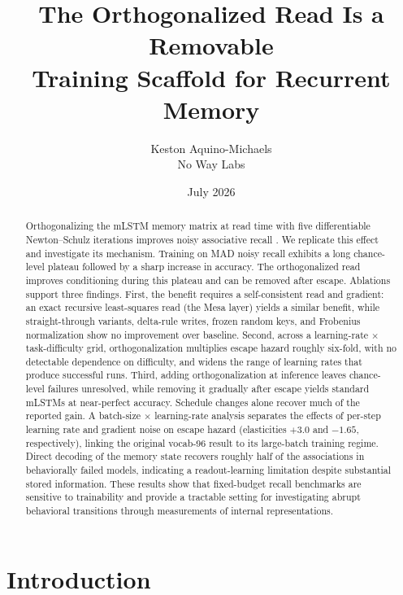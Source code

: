 \documentclass[11pt]{article}
\title{The Orthogonalized Read Is a Removable\\ Training Scaffold for Recurrent Memory}
\author{Keston Aquino-Michaels\\
  No Way Labs}
\date{July 2026}
\begin{document}
\maketitle

\begin{abstract}
Orthogonalizing the mLSTM memory matrix at read time with five differentiable
Newton--Schulz iterations improves noisy associative recall
\citep{tambde2026ortho}. We replicate this effect and investigate its mechanism.
Training on MAD noisy recall exhibits a long chance-level plateau followed by a
sharp increase in accuracy. The orthogonalized read improves conditioning during
this plateau and can be removed after escape. Ablations support three findings.
First, the benefit requires a self-consistent read and gradient: an exact
recursive least-squares read (the Mesa layer) yields a similar benefit, while
straight-through variants, delta-rule writes, frozen random keys, and Frobenius
normalization show no improvement over baseline. Second, across a learning-rate
$\times$ task-difficulty grid, orthogonalization multiplies escape hazard roughly
six-fold, with no detectable dependence on difficulty, and widens the range of
learning rates that produce successful runs. Third, adding orthogonalization at
inference leaves chance-level failures unresolved, while removing it gradually
after escape yields standard mLSTMs at near-perfect accuracy. Schedule changes
alone recover much of the reported gain. A batch-size $\times$ learning-rate
analysis separates the effects of per-step learning rate and gradient noise on
escape hazard (elasticities $+3.0$ and $-1.65$, respectively), linking the original
vocab-96 result to its large-batch training regime. Direct decoding of the memory
state recovers roughly half of the associations in behaviorally failed models,
indicating a readout-learning limitation despite substantial stored information.
These results show that fixed-budget recall benchmarks are sensitive to
trainability and provide a tractable setting for investigating abrupt behavioral
transitions through measurements of internal representations.
\end{abstract}

\section{Introduction}
\label{sec:intro}
\end{document}
